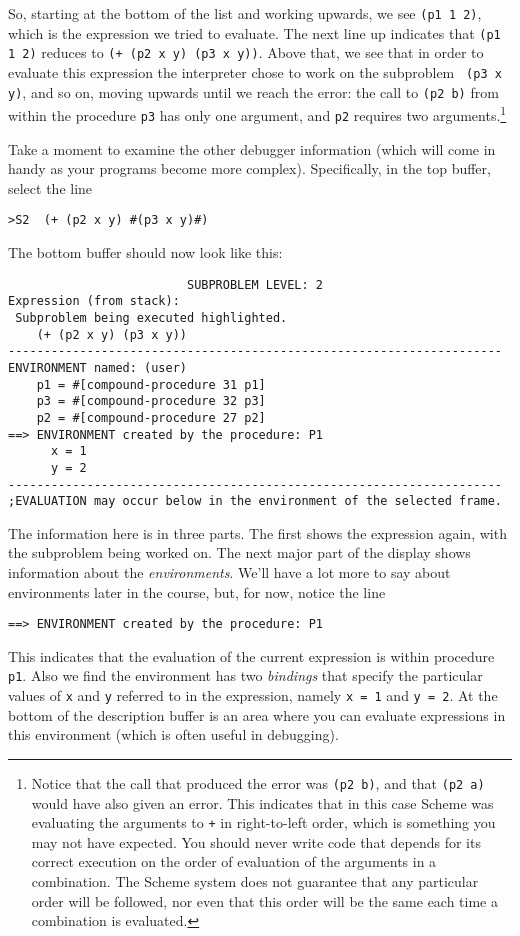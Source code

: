 So, starting at the bottom of the list and working upwards, we see
{\tt (p1 1 2)}, which is the expression we tried to evaluate.  The
next line up indicates that {\tt (p1 1 2)} reduces to {\tt (+
(p2 x y) (p3 x y))}.  Above that, we see that in order to evaluate
this expression the interpreter chose to work on the subproblem {\tt
(p3 x y)}, and so on, moving upwards until we reach the error: the
call to {\tt (p2 b)} from within the procedure {\tt p3} has only one
argument, and {\tt p2} requires two arguments.\footnote{Notice that
the call that produced the error was {\tt (p2 b)}, and that {\tt (p2
a)} would have also given an error.  This indicates that in this case
Scheme was evaluating the arguments to {\tt +} in right-to-left order,
which is something you may not have expected.  You should never write
code that depends for its correct execution on the order of evaluation
of the arguments in a combination.  The Scheme system does not
guarantee that any particular order will be followed, nor even
that this order will be the same each time a combination is
evaluated.}

Take a moment to examine the other debugger information (which will
come in handy as your programs become more complex).  Specifically, in
the top buffer, select the line
{\small
\begin{verbatim}
>S2  (+ (p2 x y) #(p3 x y)#)
\end{verbatim}
}

The bottom buffer should now look like this: 
{\small
\begin{verbatim}
                         SUBPROBLEM LEVEL: 2
Expression (from stack):
 Subproblem being executed highlighted.
    (+ (p2 x y) (p3 x y))
---------------------------------------------------------------------
ENVIRONMENT named: (user)
    p1 = #[compound-procedure 31 p1]
    p3 = #[compound-procedure 32 p3]
    p2 = #[compound-procedure 27 p2]
==> ENVIRONMENT created by the procedure: P1
      x = 1
      y = 2
---------------------------------------------------------------------
;EVALUATION may occur below in the environment of the selected frame.
\end{verbatim}
}

The information here is in three parts.  The first shows the
expression again, with the subproblem being worked on.  The next major
part of the display shows information about the {\it environments}.
We'll have a lot more to say about environments later in the course,
but, for now, notice the line
{\small
\begin{verbatim}
==> ENVIRONMENT created by the procedure: P1
\end{verbatim}
}
This indicates that the evaluation of the current expression is within
procedure {\tt p1}.  Also we find the environment has two {\it bindings}
that specify the particular values of {\tt x} and {\tt y} referred
to in the expression, namely {\tt x = 1} and {\tt y = 2}.  At the bottom
of the description buffer is an area where you can evaluate
expressions in this environment (which is often useful in debugging).

